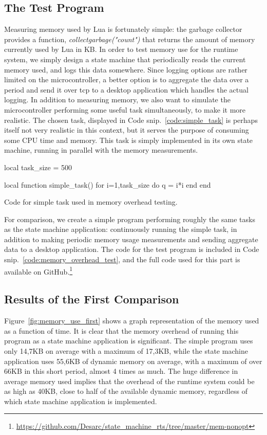 \subsection{The Test Program}
\label{sec:test_program}
Measuring memory used by Lua is fortunately simple: the garbage collector provides a function, \emph{collectgarbage("count")} that returns the amount of memory currently used by Lua in KB. In order to test memory use for the runtime system, we simply design a state machine that periodically reads the current memory used, and logs this data somewhere. Since logging options are rather limited on the microcontroller, a better option is to aggregate the data over a period and send it over \gls{tcp} to a desktop application which handles the actual logging. In addition to measuring memory, we also want to simulate the microcontroller performing some useful task simultaneously, to make it more realistic. The chosen task, displayed in Code snip.~\ref{code:simple_task} is perhaps itself not very realistic in this context, but it serves the purpose of consuming some CPU time and memory. This task is simply implemented in its own state machine, running in parallel with the memory measurements.

\begin{listing}[htp]
\begin{luacode}
local task_size = 500

local function simple_task()
	for i=1,task_size do
		q = i*i
	end
end
\end{luacode}
	\caption{Code for simple task used in memory overhead testing.}
	\label{code:simple_task}
\end{listing}

\noindent
For comparison, we create a simple program performing roughly the same tasks as the state machine application: continuously running the simple task, in addition to making periodic memory usage measurements and sending aggregate data to a desktop application. The code for the test program is included in Code snip.~\ref{code:memory_overhead_test}, and the full code used for this part is available on GitHub.\footnote{\url{https://github.com/Desarc/state_machine_rts/tree/master/mem-nonopt}}

\subsection{Results of the First Comparison}
\label{sec:first_comparison}
Figure~\ref{fig:memory_use_first} shows a graph representation of the memory used as a function of time. It is clear that the memory overhead of running this program as a state machine application is significant. The simple program uses only 14,7KB on average with a maximum of 17,3KB, while the state machine application uses 55,6KB of dynamic memory on average, with a maximum of over 66KB in this short period, almost 4 times as much. The huge difference in average memory used implies that the overhead of the runtime system could be as high as 40KB, close to half of the available dynamic memory, regardless of which state machine application is implemented.

